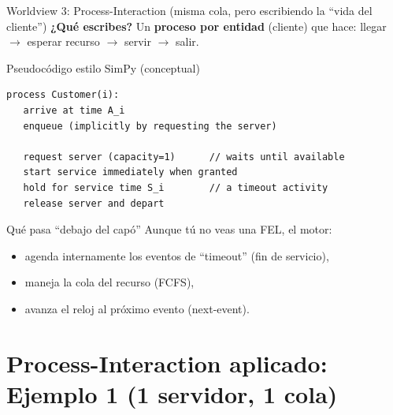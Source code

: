 \documentclass[aspectratio=1610, 9pt]{beamer}
\begin{document}
\begin{frame}[fragile]{Worldview 3: Process-Interaction (misma cola, pero escribiendo la “vida del cliente”) }
\small
\textbf{¿Qué escribes?} Un \textbf{proceso por entidad} (cliente) que hace: llegar $\to$ esperar recurso $\to$ servir $\to$ salir.

\vspace{3pt}
\begin{block}{Pseudocódigo estilo SimPy (conceptual)}
\end{block}
\begin{verbatim}
process Customer(i):
   arrive at time A_i
   enqueue (implicitly by requesting the server)

   request server (capacity=1)      // waits until available
   start service immediately when granted
   hold for service time S_i        // a timeout activity
   release server and depart
\end{verbatim}

\vspace{2pt}
\begin{block}{Qué pasa “debajo del capó”}
Aunque tú no veas una FEL, el motor:
\begin{itemize}
\item agenda internamente los eventos de “timeout” (fin de servicio),
\item maneja la cola del recurso (FCFS),
\item avanza el reloj al próximo evento (next-event).
\end{itemize}
\end{block}
\end{frame}



\section{Process-Interaction aplicado: Ejemplo 1 (1 servidor, 1 cola)}
\end{document}

